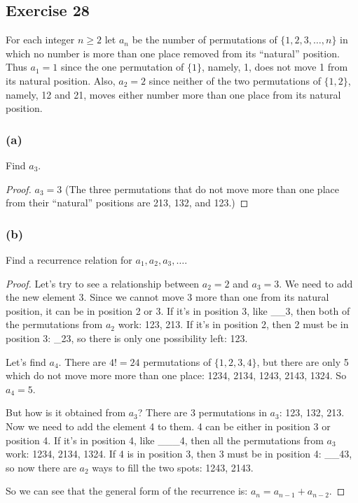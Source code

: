 \documentclass[14pt]{extarticle}
\begin{document}
\subsection{Exercise 28}
For each integer \(n \geq 2\) let \(a_n\) be the number of permutations of \(\{1, 2, 3, \ldots, n\}\) in which no 
number is more than one place removed from its “natural” position. Thus \(a_1 = 1\) since the one permutation of 
\(\{1\}\), namely, 1, does not move 1 from its natural position. Also, \(a_2 = 2\) since neither of the two 
permutations of \(\{1, 2\}\), namely, 12 and 21, moves either number more than one place from its natural position.

\subsubsection{(a)}
Find \(a_3\).

\begin{proof}
\(a_3 = 3\) (The three permutations that do not move more than one place from their “natural” positions are 213, 132, 
and 123.)
\end{proof}

\subsubsection{(b)}
Find a recurrence relation for \(a_1, a_2, a_3, \ldots\).

\begin{proof}
Let's try to see a relationship between \(a_2 = 2\) and \(a_3 = 3\). We need to add the new element 3. Since we 
cannot move 3 more than one from its natural position, it can be in position 2 or 3. If it's in position 3, like 
\_\_3, then both of the permutations from \(a_2\) work: 123, 213. If it's in position 2, then 2 must be in position 
3: \_23, so there is only one possibility left: 123.

Let's find $a_4$. There are \(4! = 24\) permutations of \(\{1,2,3,4\}\), but there are only 5 which do not move more
more than one place: 1234, 2134, 1243, 2143, 1324. So \(a_4 = 5\). 

But how is it obtained from \(a_3\)? There are 3 permutations in $a_3$: 123, 132, 213. Now we need to add 
the element 4 to them. 4 can be either in position 3 or position 4. If it's in position 4, like \_\_\_4, then all 
the permutations from $a_3$ work: 1234, 2134, 1324. If 4 is in position 3, then 3 must be in position 4: \_\_43, so now
there are $a_2$ ways to fill the two spots: 1243, 2143.

So we can see that the general form of the recurrence is: \(a_n = a_{n-1} + a_{n-2}\).
\end{proof}
\end{document}
